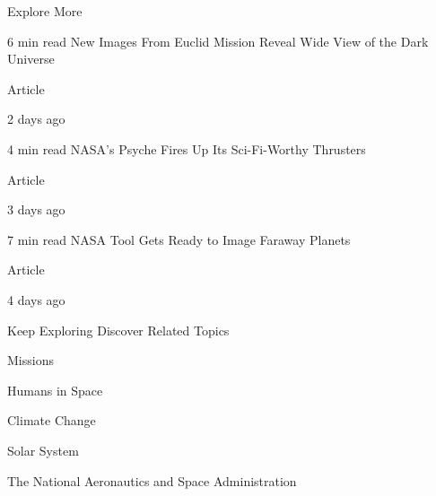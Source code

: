 \documentclass[a4paper,11pt]{article}
\begin{document}
\begin{docenv}
{Explore More

 

6 min read
New Images From Euclid Mission Reveal Wide View of the Dark Universe

Article

	2 days ago	

 

4 min read
NASA’s Psyche Fires Up Its Sci-Fi-Worthy Thrusters

Article

	3 days ago	

 

7 min read
NASA Tool Gets Ready to Image Faraway Planets

Article

	4 days ago	

 

Keep Exploring
Discover Related Topics

Missions

 

Humans in Space

 

Climate Change

 

Solar System

 

The National Aeronautics and Space Administration}
\end{docenv}
\end{document}
